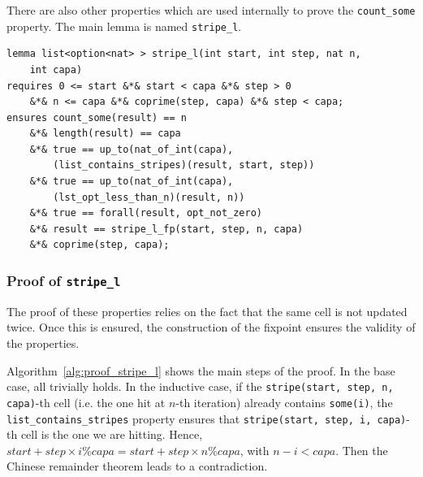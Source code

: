 \documentclass[oneside]{article}
\begin{document}
There are also other properties which are used internally to prove the \texttt{count\_some} property. The main lemma is named \texttt{stripe\_l}.

\begin{lemma}
	\begin{lstlisting}
lemma list<option<nat> > stripe_l(int start, int step, nat n, 
	int capa)
requires 0 <= start &*& start < capa &*& step > 0 
	&*& n <= capa &*& coprime(step, capa) &*& step < capa;
ensures count_some(result) == n
	&*& length(result) == capa
	&*& true == up_to(nat_of_int(capa), 
		(list_contains_stripes)(result, start, step))
	&*& true == up_to(nat_of_int(capa), 
		(lst_opt_less_than_n)(result, n))
	&*& true == forall(result, opt_not_zero)
	&*& result == stripe_l_fp(start, step, n, capa)
	&*& coprime(step, capa);
	\end{lstlisting}
\end{lemma}

\subsubsection{Proof of \texttt{stripe\_l}}
The proof of these properties relies on the fact that the same cell is not updated twice. Once this is ensured, the construction of the fixpoint ensures the validity of the properties. 

Algorithm~\ref{alg:proof_stripe_l} shows the main steps of the proof. In the base case, all trivially holds. In the inductive case, if the \texttt{stripe(start, step, n, capa)}-th cell (i.e. the one hit at $n$-th iteration) already contains \texttt{some(i)}, the \texttt{list\_contains\_stripes} property ensures that \texttt{stripe(start, step, i, capa)}-th cell is the one we are hitting. Hence, $start + step\times i \%capa = start + step\times n \%capa$, with $n-i < capa$. Then the Chinese remainder theorem leads to a contradiction.
\end{document}
